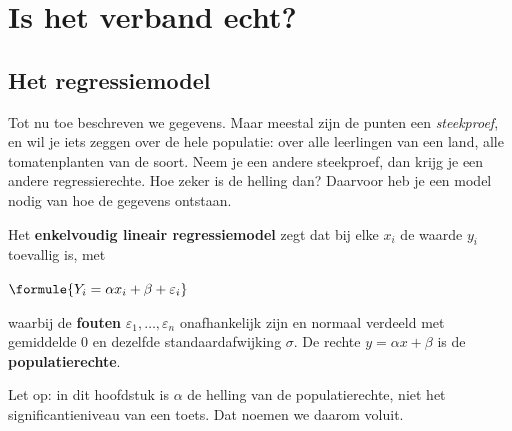 \section{Is het verband echt?}

\subsection{Het regressiemodel}

Tot nu toe beschreven we gegevens. Maar meestal zijn de punten een \textit{steekproef}, en wil je iets zeggen over de hele populatie: over alle leerlingen van een land, alle tomatenplanten van de soort. Neem je een andere steekproef, dan krijg je een andere regressierechte. Hoe zeker is de helling dan? Daarvoor heb je een model nodig van hoe de gegevens ontstaan.

\begin{theorie}
Het \textbf{\textcolor{accent}{enkelvoudig lineair regressiemodel}} zegt dat bij elke $x_i$ de waarde $y_i$ toevallig is, met

\vspace{1mm}
\qquad $\formule{Y_i = \alpha x_i + \beta + \varepsilon_i}$

\vspace{1mm}
waarbij de \textbf{\textcolor{accent}{fouten}} $\varepsilon_1, \ldots, \varepsilon_n$ onafhankelijk zijn en normaal verdeeld met gemiddelde 0 en dezelfde standaardafwijking $\sigma$. De rechte $y = \alpha x + \beta$ is de \textbf{\textcolor{accent}{populatierechte}}.
\end{theorie}

Let op: in dit hoofdstuk is $\alpha$ de helling van de populatierechte, niet het significantieniveau van een toets. Dat noemen we daarom voluit.


